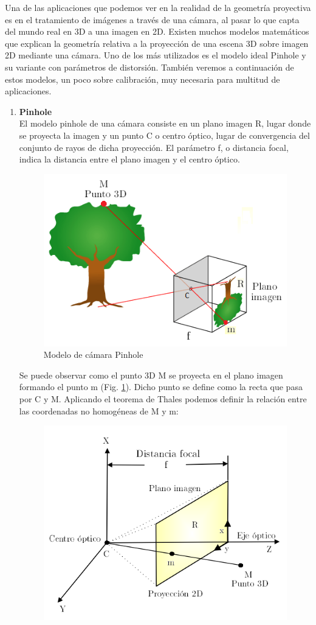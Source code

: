 \documentclass[a4,10pt]{article}
\begin{document}
Una de las aplicaciones que podemos ver en la realidad de la geometría proyectiva es en el tratamiento de imágenes a través de una cámara, al pasar lo que capta del mundo real en 3D a una imagen en 2D.
Existen muchos modelos matemáticos que explican la geometría relativa a la proyección de una escena 3D sobre imagen 2D mediante una cámara. Uno de los más utilizados es el modelo ideal Pinhole y su variante con parámetros de distorsión. También veremos a continuación de estos modelos, un poco sobre calibración, muy necesaria para multitud de aplicaciones.
\begin{enumerate}

\item \textbf{Pinhole}\\
El modelo pinhole de una cámara consiste en un plano imagen R, lugar donde se proyecta la imagen y un punto C o centro óptico, lugar de convergencia del conjunto de rayos de dicha proyección. El parámetro f, o distancia focal, indica la distancia entre el plano imagen y el centro óptico.
\begin{figure}
\begin{center}
\includegraphics[width=0.6\linewidth]{images/pinhole}
\end{center}
\caption{Modelo de cámara Pinhole}
\label{fig:pinhole}
\end{figure}
Se puede observar como el punto 3D M se proyecta en el plano imagen formando el punto m (Fig. \ref{fig:pinhole}). Dicho punto se define como la recta que pasa por C y M. Aplicando el teorema de Thales podemos definir la relación entre las coordenadas no homogéneas de M y m:
\begin{figure}
\begin{center}
\includegraphics[width=0.7\linewidth]{images/pinholegeo}

\end{center}
\end{figure}
\end{enumerate}
\end{document}
